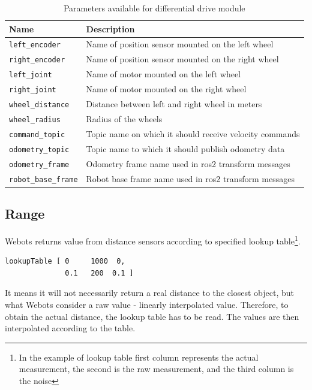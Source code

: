 \begin{table}[H]
    \centering
    \begin{tabular}{|l|l|}
        \hline
        \textbf{Name} & \textbf{Description} \\
        \hline
        \texttt{left\_encoder} & Name of position sensor mounted on the left wheel \\
        \hline
        \texttt{right\_encoder} & Name of position sensor mounted on the right wheel \\
        \hline
        \texttt{left\_joint} & Name of motor mounted on the left wheel \\
        \hline
        \texttt{right\_joint} & Name of motor mounted on the right wheel \\
        \hline
        \texttt{wheel\_distance} & Distance between left and right wheel in meters \\
        \hline
        \texttt{wheel\_radius} & Radius of the wheels \\
        \hline
        \texttt{command\_topic} & Topic name on which it should receive velocity commands \\
        \hline
        \texttt{odometry\_topic} & Topic name to which it should publish odometry data \\
        \hline
        \texttt{odometry\_frame} & Odometry frame name used in \ac{ros2} transform messages \\
        \hline
        \texttt{robot\_base\_frame} & Robot base frame name used in \ac{ros2} transform messages \\
        \hline
    \end{tabular}
    \caption{Parameters available for differential drive module}
    \label{tab:generalization:diff_driver_params}
\end{table}

\subsection{Range}
Webots returns value from distance sensors according to specified lookup table\footnote{In the example of lookup table first column represents the actual measurement, the second is the raw measurement, and the third column is the noise}. 

\begin{verbatim}
lookupTable [ 0     1000  0,
              0.1   200  0.1 ]
\end{verbatim}

It means it will not necessarily return a real distance to the closest object, but what Webots consider a raw value - linearly interpolated value. Therefore, to obtain the actual distance, the lookup table has to be read. The values are then interpolated according to the table.

